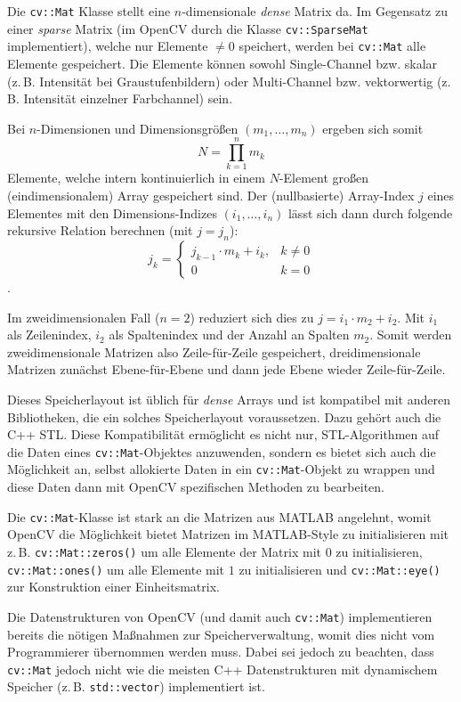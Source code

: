 \documentclass{whswinvcbook}
\begin{document}
Die \texttt{cv::Mat} Klasse stellt eine $n$-dimensionale \textit{dense} Matrix da. Im Gegensatz zu einer \textit{sparse} Matrix (im OpenCV durch die Klasse \texttt{cv::SparseMat} implementiert), welche nur Elemente $\neq0$ speichert, werden bei \texttt{cv::Mat} alle Elemente gespeichert. Die Elemente können sowohl Single-Channel bzw. skalar (z.\,B. Intensität bei Graustufenbildern) oder Multi-Channel bzw. vektorwertig (z.\,B. Intensität einzelner Farbchannel) sein.

Bei $n$-Dimensionen und Dimensionsgrößen $(m_1,\dots,m_n)$ ergeben sich somit $$N=\prod_{k=1}^{n}m_k$$ Elemente, welche intern kontinuierlich in einem $N$-Element großen (eindimensionalem) Array gespeichert sind. Der (nullbasierte) Array-Index $j$ eines Elementes mit den Dimensions-Indizes $(i_1,\dots,i_n)$ lässt sich dann durch folgende rekursive Relation berechnen\cite{opencv2} (mit $j=j_n$): $$j_k=\begin{cases}j_{k-1}\cdot m_k+i_k,&k\neq0\\0&k=0\end{cases}$$.

Im zweidimensionalen Fall ($n=2$) reduziert sich dies zu $j=i_1\cdot m_2+i_2$. Mit $i_1$ als Zeilenindex, $i_2$ als Spaltenindex und der Anzahl an Spalten $m_2$. Somit werden zweidimensionale Matrizen also Zeile-für-Zeile gespeichert, dreidimensionale Matrizen zunächst Ebene-für-Ebene und dann jede Ebene wieder Zeile-für-Zeile.

Dieses Speicherlayout ist üblich für \textit{dense} Arrays und ist kompatibel mit anderen Bibliotheken, die ein solches Speicherlayout voraussetzen. Dazu gehört auch die C++ STL. Diese Kompatibilität ermöglicht es nicht nur, STL-Algorithmen auf die Daten eines \texttt{cv::Mat}-Objektes anzuwenden, sondern es bietet sich auch die Möglichkeit an, selbst allokierte Daten in ein \texttt{cv::Mat}-Objekt zu wrappen und diese Daten dann mit OpenCV spezifischen Methoden zu bearbeiten.

Die \texttt{cv::Mat}-Klasse ist stark an die Matrizen aus MATLAB angelehnt, womit OpenCV die Möglichkeit bietet Matrizen im MATLAB-Style zu initialisieren mit z.\,B. \texttt{cv::Mat::zeros()} um alle Elemente der Matrix mit $0$ zu initialisieren, \texttt{cv::Mat::ones()} um alle Elemente mit $1$ zu initialisieren und \texttt{cv::Mat::eye()} zur Konstruktion einer Einheitsmatrix.

Die Datenstrukturen von OpenCV (und damit auch \texttt{cv::Mat}) implementieren bereits die nötigen Maßnahmen zur Speicherverwaltung, womit dies nicht vom Programmierer übernommen werden muss. Dabei sei jedoch zu beachten, dass \texttt{cv::Mat} jedoch nicht wie die meisten C++ Datenstrukturen mit dynamischem Speicher (z.\,B. \texttt{std::vector}) implementiert ist.
\end{document}
